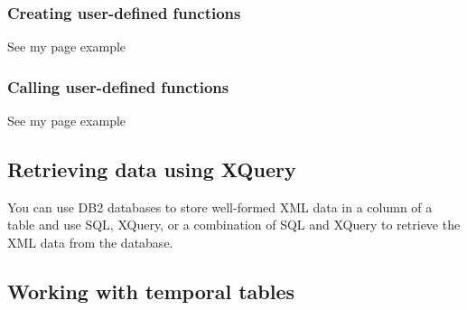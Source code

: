 \documentclass{article}
\begin{document}
\subsubsection{Creating user-defined functions}
See my page example
\subsubsection{Calling user-defined functions}
See my page example

\subsection{Retrieving data using XQuery}
You can use DB2 databases to store well-formed XML data in a column of a table and use SQL,
XQuery, or a combination of SQL and XQuery to retrieve the XML data from the database.
\subsection{Working with temporal tables}
\end{document}
